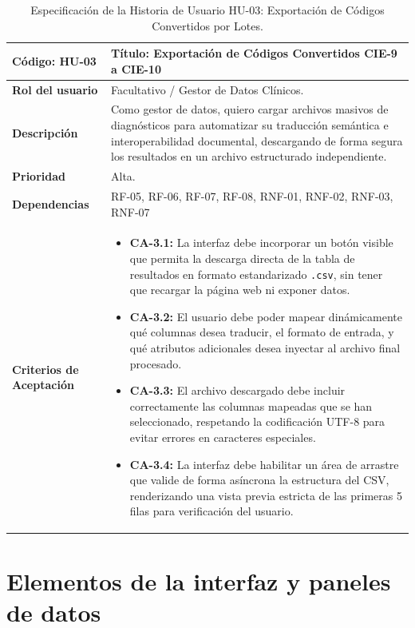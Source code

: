 \documentclass[12pt,a4paper,onecolumn,oneside]{report}
\begin{document}
\begin{table}[htbp]
\centering
\small
\renewcommand{\arraystretch}{1.0}
\begin{tabular}{|p{3.5cm}|p{10.5cm}|}
\hline
\rowcolor[RGB]{239,239,239} 
\textbf{Código: HU-03} & \textbf{Título: Exportación de Códigos Convertidos CIE-9 a CIE-10} \\ \hline
\textbf{Rol del usuario} & Facultativo / Gestor de Datos Clínicos. \\ \hline
\textbf{Descripción} & Como gestor de datos, quiero cargar archivos masivos de diagnósticos para automatizar su traducción semántica e interoperabilidad documental, descargando de forma segura los resultados en un archivo estructurado independiente. \\ \hline
\textbf{Prioridad} & Alta. \\ \hline
\textbf{Dependencias} & RF-05, RF-06, RF-07, RF-08, RNF-01, RNF-02, RNF-03, RNF-07 \\ \hline
\textbf{Criterios de Aceptación} & 
\begin{itemize}[leftmargin=*]
    \item \textbf{CA-3.1:} La interfaz debe incorporar un botón visible que permita la descarga directa de la tabla de resultados en formato estandarizado \texttt{.csv}, sin tener que recargar la página web ni exponer datos.
    \item \textbf{CA-3.2:} El usuario debe poder mapear dinámicamente qué columnas desea traducir, el formato de entrada, y qué atributos adicionales desea inyectar al archivo final procesado.
    \item \textbf{CA-3.3:} El archivo descargado debe incluir correctamente las columnas mapeadas que se han seleccionado, respetando la codificación UTF-8 para evitar errores en caracteres especiales.
    \item \textbf{CA-3.4:} La interfaz debe habilitar un área de arrastre que valide de forma asíncrona la estructura del CSV, renderizando una vista previa estricta de las primeras 5 filas para verificación del usuario.
\end{itemize} \\ \hline
\end{tabular}
\caption{Especificación de la Historia de Usuario HU-03: Exportación de Códigos Convertidos por Lotes.}
\label{tab:hu_03}
\end{table}
\clearpage
\section{Elementos de la interfaz y paneles de datos}
\end{document}
